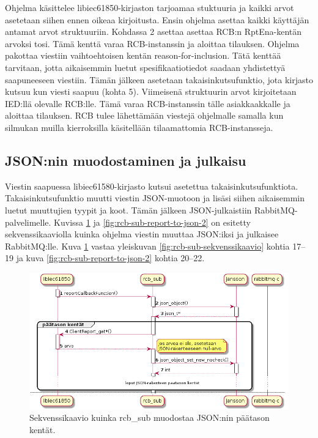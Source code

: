 Ohjelma käsittelee libiec61850-kirjaston tarjoamaa stuktuuria ja kaikki arvot asetetaan siihen ennen oikeaa kirjoitusta. Ensin ohjelma asettaa kaikki käyttäjän antamat arvot struktuuriin. Kohdassa 2 asettaa asettaa RCB:n RptEna-kentän arvoksi tosi. Tämä kenttä varaa RCB-instanssin ja aloittaa tilauksen. Ohjelma pakottaa viestiin vaihtoehtoisen kentän reason-for-inclusion. Tätä kenttää tarvitaan, jotta aikaisemmin luetut spesifikaatiotiedot saadaan yhdistettyä saapuneeseen viestiin. Tämän jälkeen asetetaan takaisinkutsufunktio, jota kirjasto kutsuu kun viesti saapuu (kohta 5). Viimeisenä struktuurin arvot kirjoitetaan IED:llä olevalle RCB:lle. Tämä varaa RCB-instanssin tälle asiakkaakkalle ja aloittaa tilauksen. RCB tulee lähettämään viestejä ohjelmalle samalla kun silmukan muilla kierroksilla käsitellään tilaamattomia RCB-instansseja.


\subsection{JSON:nin muodostaminen ja julkaisu}
Viestin saapuessa libiec61580-kirjasto kutsui asetettua takaisinkutsufunktiota. Takaisinkutsufunktio muutti viestin JSON-muotoon ja lisäsi siihen aikaisemmin luetut muuttujien tyypit ja koot. Tämän jälkeen JSON-julkaistiin RabbitMQ-palvelimelle. Kuvissa \ref{fig:rcb-sub-report-to-json-1} ja \ref{fig:rcb-sub-report-to-json-2} on esitetty sekvenssikaaviolla kuinka ohjelma viestin muuttaa JSON:iksi ja julkaisee RabbitMQ:lle. Kuva \ref{fig:rcb-sub-report-to-json-1} vastaa yleiskuvan \ref{fig:rcb-sub-sekvenssikaavio} kohtia 17--19 ja kuva \ref{fig:rcb-sub-report-to-json-2} kohtia 20--22.

\begin{figure}[ht!]
	\includegraphics[width=1\textwidth]{pictures/rcb-sub-report-to-json.png}
	\caption{Sekvenssikaavio kuinka rcb\_sub muodostaa JSON:nin päätason kentät.}
	\label{fig:rcb-sub-report-to-json-1}
\end{figure}

